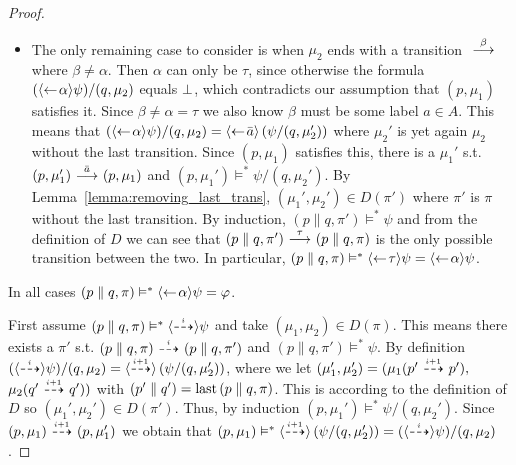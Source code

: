 \begin{proof}
\begin{itemize}
        \item The only remaining case to consider is when $\mu_2$ ends with a transition
            $\ {\stackrel{{\beta}}{\longrightarrow}}\ $ where $\beta \ne \alpha$. Then $\alpha$ can only be $\tau$,
            since otherwise the formula $(\mbox{\ensuremath{\langle\leftarrow\! \alpha \rangle}}\psi)/(q,\mu_2)$
            equals $\bot$, which contradicts our assumption
            that $(p,\mu_1)$ satisfies it. Since $\beta\ne\alpha = \tau$ we also know $\beta$
            must be some label $a\in A$. This means that $(\mbox{\ensuremath{\langle\leftarrow\! \alpha \rangle}}\psi)/(q,\mu_2)
            = \mbox{\ensuremath{\langle\leftarrow\! \bar{a} \rangle}} \left( \psi / (q, \mu_2') \right)$ where $\mu_2'$ is yet
            again $\mu_2$ without the last transition. Since $(p,\mu_1)$ satisfies this,
            there is a $\mu_1'$ s.t. $(p,\mu_1')\ {\stackrel{{\bar{a}}}{\longrightarrow}}\ (p,\mu_1)$ and $(p,\mu_1')
            \vDash^* \psi/(q,\mu_2')$. By
            Lemma~\ref{lemma:removing_last_trans}, $(\mu_1',\mu_2')\in D(\pi')$ where
            $\pi'$ is $\pi$ without the last transition. By induction, $(p\parallel q, \pi')
            \vDash^* \psi$ and from the definition of $D$ we can see that $(p\parallel q,\pi')
            \ {\stackrel{{\tau}}{\longrightarrow}}\  (p\parallel q,\pi)$ is the only possible transition between the
            two. In particular,
            $(p\parallel q,\pi) \vDash^* \mbox{\ensuremath{\langle\leftarrow\! \tau \rangle}} \psi
            = \mbox{\ensuremath{\langle\leftarrow\! \alpha \rangle}}\psi$.
    \end{itemize}
    In all cases $(p\parallel q,\pi) \vDash^* \mbox{\ensuremath{\langle\leftarrow\! \alpha \rangle}}\psi = \varphi$.



    \par\nobreak
    \ltr First assume $(p\parallel q, \pi) \vDash^* \mbox{\ensuremath{\langle\stackrel{_{i}}{\dashrightarrow}\rangle}}\psi$ and take $(\mu_1,\mu_2)
    \in D(\pi)$. This means there exists
    a $\pi'$ s.t. $(p\parallel q, \pi) \ {\stackrel{_{i}}{\dashrightarrow}}\  (p\parallel q, \pi')$ and $(p\parallel q,
    \pi')\vDash^* \psi$. By definition
    $(\mbox{\ensuremath{\langle\stackrel{_{i}}{\dashrightarrow}\rangle}}\psi)/(q,\mu_2) = \mbox{\ensuremath{\langle\stackrel{_{i+1}}{\dashrightarrow}\rangle}} \left( \psi / (q, \mu_2') \right)$,
    where we let $(\mu_1',
    \mu_2') = (\mu_1(p'\ {\stackrel{_{i+1}}{\dashrightarrow}}\ p'),$ $\mu_2(q'\ {\stackrel{_{i+1}}{\dashrightarrow}}\ q'))$ with $(p' \parallel q') =
    \operatorname{last}{(p\parallel q, \pi)}$. This is according to the definition of $D$ so $(\mu_1',\mu_2')
    \in D(\pi')$. Thus, by induction $(p,\mu_1') \vDash^* \psi / (q,\mu_2')$. Since $(p,\mu_1)
    \ {\stackrel{_{i+1}}{\dashrightarrow}}\  (p,\mu_1')$ we obtain that $(p,\mu_1) \vDash^* \mbox{\ensuremath{\langle\stackrel{_{i+1}}{\dashrightarrow}\rangle}} \left(
    \psi / (q,\mu_2') \right) = (\mbox{\ensuremath{\langle\stackrel{_{i}}{\dashrightarrow}\rangle}}\psi)/(q,\mu_2)$.


\end{proof}
